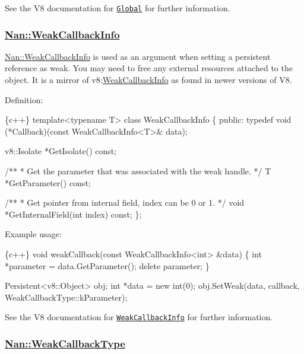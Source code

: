 See the V8 documentation for \href{https://v8docs.nodesource.com/io.js-3.0/d5/d40/classv8_1_1_global.html}{\tt {\ttfamily Global}} for further information.

\label{_api_nan_weak_callback_info}%
 \subsubsection*{\hyperlink{class_nan_1_1_weak_callback_info}{Nan\+::\+Weak\+Callback\+Info}}

{\ttfamily \hyperlink{class_nan_1_1_weak_callback_info}{Nan\+::\+Weak\+Callback\+Info}} is used as an argument when setting a persistent reference as weak. You may need to free any external resources attached to the object. It is a mirror of {\ttfamily v8\+:\hyperlink{class_weak_callback_info}{Weak\+Callback\+Info}} as found in newer versions of V8.

Definition\+:


\begin{DoxyCode}
\{c++\}
template<typename T> class WeakCallbackInfo \{
 public:
  typedef void (*Callback)(const WeakCallbackInfo<T>& data);

  v8::Isolate *GetIsolate() const;

  /**
   * Get the parameter that was associated with the weak handle.
   */
  T *GetParameter() const;

  /**
   * Get pointer from internal field, index can be 0 or 1.
   */
  void *GetInternalField(int index) const;
\};
\end{DoxyCode}


Example usage\+:


\begin{DoxyCode}
\{c++\}
void weakCallback(const WeakCallbackInfo<int> &data) \{
  int *parameter = data.GetParameter();
  delete parameter;
\}

Persistent<v8::Object> obj;
int *data = new int(0);
obj.SetWeak(data, callback, WeakCallbackType::kParameter);
\end{DoxyCode}


See the V8 documentation for \href{https://v8docs.nodesource.com/io.js-3.0/d8/d06/classv8_1_1_weak_callback_info.html}{\tt {\ttfamily Weak\+Callback\+Info}} for further information.

\label{_api_nan_weak_callback_type}%
 \subsubsection*{\hyperlink{struct_nan_1_1_weak_callback_type}{Nan\+::\+Weak\+Callback\+Type}}

